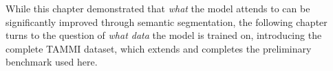 While this chapter demonstrated that \textit{what} the
model attends to can be significantly improved through
semantic segmentation, the following chapter turns to the
question of \textit{what data} the model is trained on,
introducing the complete TAMMI dataset, which extends and
completes the preliminary benchmark used here.

